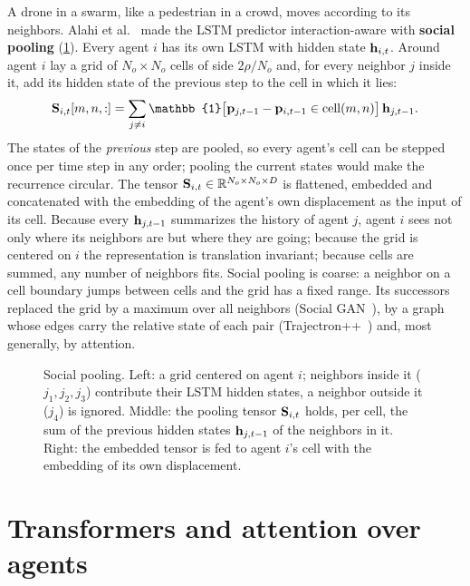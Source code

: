 A drone in a swarm, like a pedestrian in a crowd, moves according to its
neighbors. Alahi et al.~\cite{alahi2016social} made the LSTM predictor
interaction-aware with \textbf{social pooling}
(\cref{fig:ch20-social-pooling}). Every agent $i$ has its own LSTM with
hidden state $\mathbf{h}_{i,t}$. Around agent $i$ lay a grid of $N_o \times N_o$
cells of side $2\rho/N_o$ and, for every neighbor $j$ inside it, add its
hidden state of the previous step to the cell in which it lies:
\begin{equation}
  \mat{S}_{i,t}[m, n, :] = \sum_{j \ne i} \mathbb{1}\bigl[\pos_{j,t-1} - \pos_{i,t-1} \in \text{cell}(m, n)\bigr]\,\vect{h}_{j,t-1} .
  \label{eq:ch20-pooling}
\end{equation}
The states of the \emph{previous} step are pooled, so every agent's cell can
be stepped once per time step in any order; pooling the current states would
make the recurrence circular. The tensor $\mathbf{S}_{i,t} \in \mathbb{R}^{N_o \times
N_o \times D}$ is flattened, embedded and concatenated with the embedding of
the agent's own displacement as the input of its cell. Because every
$\mathbf{h}_{j,t-1}$ summarizes the history of agent $j$, agent $i$ sees not
only where its neighbors are but where they are going; because the grid is
centered on $i$ the representation is translation invariant; because cells are
summed, any number of neighbors fits. Social pooling is coarse: a neighbor
on a cell boundary jumps between cells and the grid has a fixed range. Its
successors replaced the grid by a maximum over all neighbors (Social
GAN~\cite{gupta2018social}), by a graph whose edges carry the relative state
of each pair (Trajectron++~\cite{salzmann2020trajectron}) and, most
generally, by attention.

\begin{figure}[tb]
  \centering
  \caption{Social pooling. Left: a grid centered on agent $i$; neighbors
  inside it ($j_1, j_2, j_3$) contribute their LSTM hidden states, a
  neighbor outside it ($j_4$) is ignored. Middle: the pooling tensor
  $\mathbf{S}_{i,t}$ holds, per cell, the sum of the previous hidden states
  $\mathbf{h}_{j,t-1}$ of the neighbors in it. Right: the embedded tensor is
  fed to agent $i$'s cell with the embedding of its own displacement.}
  \label{fig:ch20-social-pooling}
\end{figure}

\section{Transformers and attention over agents}
\label{sec:ch20-transformer}

